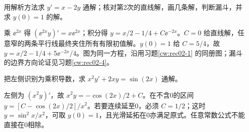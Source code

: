 \begin{exercise}\label{cw:rec04-2}
用解析方法求 $y'=x-2y$ 通解；核对第2次的直线解，画几条解，判断漏斗，并求 $y(0)=1$ 的解。
\end{exercise}
\begin{solution}
乘 $\ee^{2x}$ 得 $(\ee^{2x}y)'=x\ee^{2x}$；积分得 $y=x/2-1/4+C\ee^{-2x}$。$C=0$ 给直线解，任意窄的两条平行线最终夹住所有有限初值解。$y(0)=1$ 给 $C=5/4$，故 $y=x/2-1/4+5\ee^{-2x}/4$。图为同一方程，沿用习题\ref{cw:rec02-1} 的同册图；漏斗的边界方向论证见习题\ref{cw:rec02-4}。
\par{}
\end{solution}

\begin{exercise}\label{cw:rec04-3}
把左侧识别为乘积导数，求 $x^2y'+2xy=\sin(2x)$ 通解。
\end{exercise}
\begin{solution}
左侧为 $(x^2y)'$，故 $x^2y=-\cos(2x)/2+C$。在不含0的区间 $y=[C-\cos(2x)/2]/x^2$。若要连续延至0，必须 $C=1/2$；这时 $y=\sin^2x/x^2$，可取 $y(0)=1$，且光滑延拓在0亦满足原式。任意常数公式不能直接在0相除。
\par{}
\end{solution}

